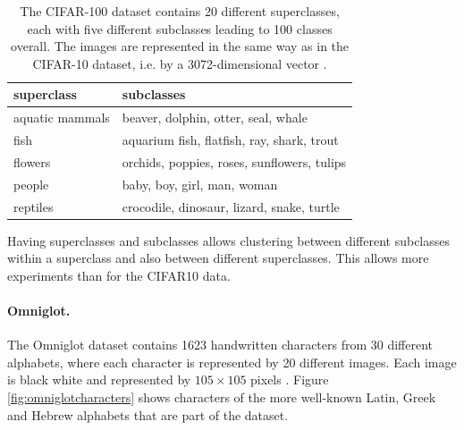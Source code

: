 \begin{table}[h]
    \centering
    \begin{tabular}{|l|l|}
    \hline
    superclass      & subclasses                                  \\ \hline
    aquatic mammals & beaver, dolphin, otter, seal, whale         \\
    fish            & aquarium fish, flatfish, ray, shark, trout  \\
    flowers         & orchids, poppies, roses, sunflowers, tulips \\
    people          & baby, boy, girl, man, woman                 \\ 
    reptiles        & crocodile, dinosaur, lizard, snake, turtle  \\ \hline               
    \end{tabular}
    \caption{The CIFAR-100 dataset contains 20 different superclasses, each with five different subclasses leading to 100 classes overall. The images are represented in the same way as in the CIFAR-10 dataset, i.e. by a 3072-dimensional vector \cite{Krizhevsky2009LearningML}.}
    \label{table:cifar100data}
\end{table}

Having superclasses and subclasses allows clustering between different subclasses within a superclass and also between different superclasses. This allows more experiments than for the CIFAR10 data.

\paragraph{Omniglot.}The Omniglot dataset contains 1623 handwritten characters from 30 different alphabets, where each character is represented by 20 different images. Each image is black white and represented by $105 \times 105$ pixels \cite{Lake1332}. Figure \ref{fig:omniglotcharacters} shows characters of the more well-known Latin, Greek and Hebrew alphabets that are part of the dataset.

